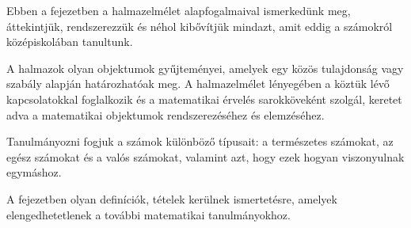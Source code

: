 \bgroup
\color{gray!50!black}
\sffamily
Ebben a fejezetben a halmazelmélet alapfogalmaival ismerkedünk meg, áttekintjük,
rendszerezzük és néhol kibővítjük mindazt, amit eddig a számokról középiskolában
tanultunk.

A halmazok olyan objektumok gyűjteményei, amelyek egy közös tulajdonság vagy
szabály alapján határozhatóak meg. A halmazelmélet lényegében a köztük lévő
kapcsolatokkal foglalkozik és a matematikai érvelés sarokköveként szolgál,
keretet adva a matematikai objektumok rendszerezéséhez és elemzéséhez.

Tanulmányozni fogjuk a számok különböző típusait: a természetes számokat, az
egész számokat és a valós számokat, valamint azt, hogy ezek hogyan viszonyulnak
egymáshoz.

A fejezetben olyan definíciók, tételek kerülnek ismertetésre, amelyek
elengedhetetlenek a további matematikai tanulmányokhoz.

\chaptertoc
\egroup

\clearpage